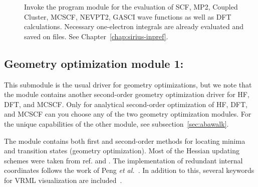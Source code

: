 \begin{description}
\item[]
Invoke the {\sir} program module for the evaluation of SCF, MP2, Coupled
Cluster, MCSCF, NEVPT2, GASCI wave functions as well as DFT calculations.
Necessary one-electron integrals are already evaluated and saved on files.
See Chapter~\ref{chap:sirius-inpref}.
\end{description}

%

\subsection{Geometry optimization module 1: }\label{subsec:minimize}

This submodule is the usual driver for geometry optimizations,
but we note that the  module contains another second-order
geometry optimization driver for HF, DFT, and MCSCF.
Only for analytical second-order optimization of HF, DFT, and MCSCF can you choose
any of the two geometry optimization modules.
For the unique capabilities of the other module, see subsection~\ref{sec:abawalk}.

The  module contains both first and second-order methods
for locating minima and transition states (geometry optimization).
Most of the Hessian updating schemes were taken from
ref.\cite{thkrprt95} and \cite{Fletcher}.
The implementation of redundant internal coordinates
follows the work of Peng {\it et al.\/}~\cite{cppyahbsmjfjcc17}.
In addition to this, several keywords for VRML visualization are included~\cite{VRML}.

